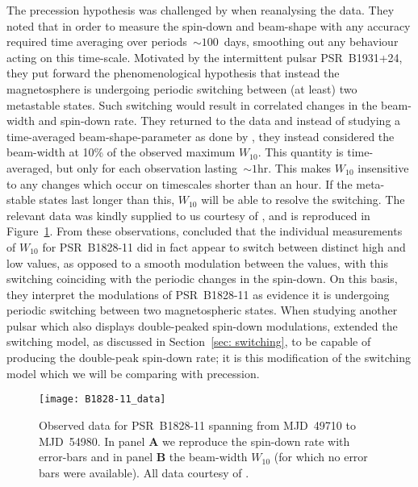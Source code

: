 \documentclass[../full_thesis/full_thesis.tex]{subfiles}
\begin{document}
The precession hypothesis was challenged by \citet{Lyne2010} when reanalysing
the data.   They noted that in order to measure the spin-down and beam-shape
with any accuracy required time averaging over periods~$\sim100$~days,
smoothing out any behaviour acting on this time-scale. Motivated by the
intermittent pulsar PSR~B1931+24, they put forward the phenomenological hypothesis
that instead the magnetosphere is undergoing periodic switching between (at
least) two metastable states. Such switching would result in correlated changes
in the beam-width and spin-down rate. They returned to the data and instead of
studying a time-averaged beam-shape-parameter as done by \citet{Stairs2000},
they instead considered the beam-width at 10\% of the observed maximum
$W_{10}$. This quantity is time-averaged, but only for each observation
lasting~$\sim1$hr. This makes $W_{10}$ insensitive to any changes which occur on
timescales shorter than an hour. If the meta-stable states last longer than
this, $W_{10}$ will be able to resolve the switching. The  relevant data was
kindly supplied to us courtesy of \citet{Lyne2010}, and is reproduced in
Figure~\ref{fig: B1828-11 data}. From these observations,
\citet{Lyne2010} concluded that the individual measurements of $W_{10}$ for
PSR~B1828-11 did in fact appear to switch between distinct high and low values, as
opposed to a smooth modulation between the values, with this switching
coinciding with the periodic changes in the spin-down. On this basis, they
interpret the modulations of PSR~B1828-11 as evidence it is undergoing periodic
switching between two magnetospheric states. When studying another pulsar which
also displays double-peaked spin-down modulations, \citet{Perera2015} extended
the switching model, as discussed in Section~\ref{sec: switching}, to be capable
of producing the double-peak spin-down rate; it is this modification of the
switching model which we will be comparing with precession.

\begin{figure}[htb]
\centering
\texttt{[image: B1828-11\_data]}
\caption{Observed data for PSR~B1828-11 spanning from MJD~49710 to MJD~54980.
         In panel $\textbf{A}$ we reproduce the spin-down rate with error-bars
         and in panel $\textbf{B}$ the beam-width $W_{10}$
          (for which no error bars were available). All data
         courtesy of \citet{Lyne2010}.}
\label{fig: B1828-11 data}
\end{figure}
\end{document}
